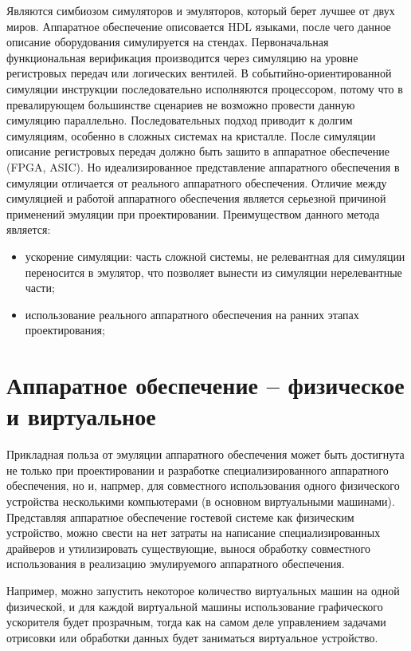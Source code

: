 Являются симбиозом симуляторов и эмуляторов, который берет лучшее от двух миров.
Аппаратное обеспечение описовается HDL языками, после чего данное описание оборудования симулируется на стендах.
Первоначальная функциональная верификация производится через симуляцию на уровне регистровых передач или логических вентилей.
В событийно-ориентированной симуляции инструкции последовательно исполняются процессором, потому что в превалирующем большинстве
сценариев не возможно провести данную симуляцию параллельно. Последовательных подход приводит к долгим симуляциям, особенно в
сложных системах на кристалле.
После симуляции описание регистровых передач должно быть зашито в аппаратное обеспечение (FPGA, ASIC).
Но идеализированное представление аппаратного обеспечения в симуляции отличается от реального аппаратного обеспечения.
Отличие между симуляцией и работой аппаратного обеспечения является серьезной причиной применений эмуляции при
проектировании.
Преимуществом данного метода является:
\begin{itemize}
    \item ускорение симуляции: часть сложной системы, не релевантная для симуляции переносится в эмулятор,
          что позволяет вынести из симуляции нерелевантные части;
    \item использование реального аппаратного обеспечения на ранних этапах проектирования;
\end{itemize}


\section{Аппаратное обеспечение -- физическое и виртуальное}\label{sec:ch1/sec2}

Прикладная польза от эмуляции аппаратного обеспечения может быть достигнута не только
при проектировании и разработке специализированного аппаратного обеспечения, но и, напрмер,
для совместного использования одного физического устройства несколькими компьютерами (в основном
виртуальными машинами).
Представляя аппаратное обеспечение гостевой системе как физическим устройство, можно
свести на нет затраты на написание специализированных драйверов и утилизировать
существующие, вынося обработку совместного использования в реализацию эмулируемого аппаратного обеспечения.

Например, можно запустить некоторое количество виртуальных машин на одной физической, и для каждой
виртуальной машины использование графического ускорителя будет прозрачным, тогда как на самом
деле управлением задачами отрисовки или обработки данных будет заниматься виртуальное устройство.

